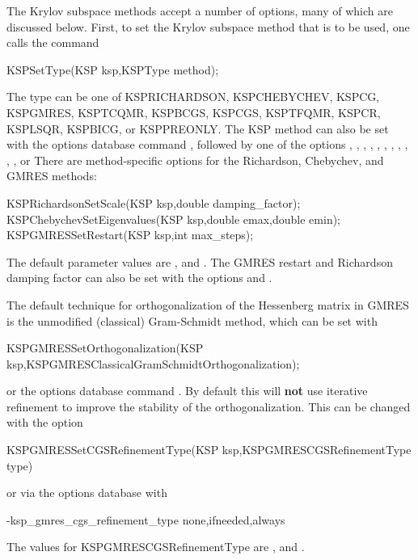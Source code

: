The Krylov subspace methods accept a number of options, many of which 
are discussed below.  First, to set the Krylov subspace method that is to 
be used, one calls the command 
\begin{tabbing}
  KSPSetType(KSP ksp,KSPType method);
\end{tabbing}
The type can be one of KSPRICHARDSON, KSPCHEBYCHEV, KSPCG, KSPGMRES, 
KSPTCQMR, KSPBCGS, KSPCGS, KSPTFQMR, KSPCR, KSPLSQR, KSPBICG, or KSPPREONLY.
The KSP method can also be set with the options database command 
,
followed by one of the options , , , , , 
, , , , , , or  
There are method-specific options for the Richardson, Chebychev,
and GMRES methods:  
\begin{tabbing}
  KSPRichardsonSetScale(KSP ksp,double damping\_factor);\\
  KSPChebychevSetEigenvalues(KSP ksp,double emax,double emin);\\
  KSPGMRESSetRestart(KSP ksp,int max\_steps);
\end{tabbing}
The default parameter values are , and . The GMRES 
 restart and Richardson damping factor
can also be set with the options 
and .  

The default technique for orthogonalization of the Hessenberg
matrix in GMRES is 
the
unmodified (classical) Gram-Schmidt method, which can be set 
with
\begin{tabbing}
  KSPGMRESSetOrthogonalization(KSP ksp,KSPGMRESClassicalGramSchmidtOrthogonalization);
\end{tabbing}
or the options database 
command .
By default this will {\bf not} use iterative refinement to improve the 
stability of the orthogonalization.
This can be changed with the option
\begin{tabbing}
KSPGMRESSetCGSRefinementType(KSP ksp,KSPGMRESCGSRefinementType type)
\end{tabbing}
or via the options database with 
\begin{tabbing}
-ksp\_gmres\_cgs\_refinement\_type none,ifneeded,always
\end{tabbing}
The values for KSPGMRESCGSRefinementType are , 
 and .
 

